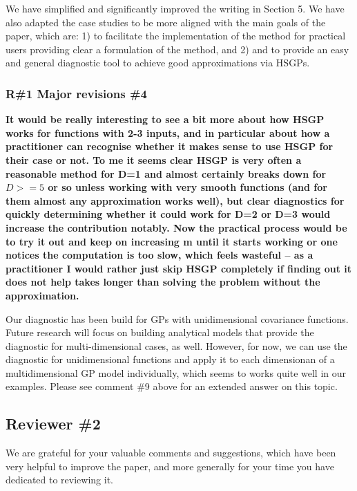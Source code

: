\documentclass[11pt]{report}
\begin{document}
We have simplified and significantly improved the writing in Section 5. We have also adapted the case studies to be more aligned with the main goals of the paper, which are: 1) to facilitate the implementation of the method for practical users providing clear a formulation of the method, and 2) and to provide an easy and general diagnostic tool to achieve good approximations via HSGPs.
 

\subsubsection*{R\#1 Major revisions \#4}

\textbf{It would be really interesting to see a bit more about how HSGP works for functions with 2-3 inputs, and in particular about how a practitioner can recognise whether it makes sense to use HSGP for their case or not. To me it seems clear HSGP is very often a reasonable method for D=1 and almost certainly breaks down for $D>=5$ or so unless working with very smooth functions (and for them almost any approximation works well), but clear diagnostics for quickly determining whether it could work for D=2 or D=3 would increase the contribution notably. Now the practical process would be to try it out and keep on increasing m until it starts working or one notices the computation is too slow, which feels wasteful -- as a practitioner I would rather just skip HSGP completely if finding out it does not help takes longer than solving the problem without the approximation.}

Our diagnostic has been build for GPs with unidimensional covariance functions. Future research will focus on building analytical models that provide the diagnostic for multi-dimensional cases, as well. However, for now, we can use the diagnostic for unidimensional functions and apply it to each dimensionan of a multidimensional GP model individually, which seems to works quite well in our examples. Please see comment \#9 above for an extended answer on this topic.

\noindent \hdashrule{12.5cm}{0.2pt}{2mm 1pt}

\subsection*{Reviewer \#2}

We are grateful for your valuable comments and suggestions, which have been very helpful to improve the paper, and more generally for your time you have dedicated to reviewing it.
\end{document}
